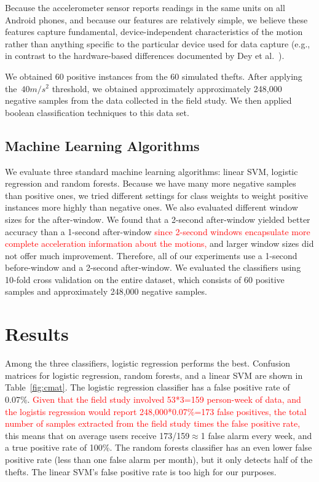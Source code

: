 Because the accelerometer sensor reports readings in the same units on all Android phones, and because our features are relatively simple, we believe these features capture fundamental, device-independent characteristics of the motion rather than anything specific to the particular device used for data capture (e.g., in contrast to the hardware-based differences documented by Dey et al.~\cite{Dey2014}).

We obtained 60 positive instances from the 60 simulated thefts.
After applying the~$40 m/s^2$ threshold, we obtained approximately approximately 248,000 negative samples from the data collected in the field study. 
We then applied boolean classification techniques to this data set.





\subsection{Machine Learning Algorithms}
We evaluate three standard machine learning algorithms: linear SVM, logistic regression and random forests.
Because we have many more negative samples than positive ones, we tried different settings for class weights to weight positive instances more highly than negative ones.
We also evaluated different window sizes for the after-window.
We found that a 2-second after-window yielded better accuracy than a 1-second after-window \textcolor{red}{since 2-second windows encapsulate more complete acceleration information about the motions,} and larger window sizes did not offer much improvement.
Therefore, all of our experiments use a 1-second before-window and a 2-second after-window.
We evaluated the classifiers using 10-fold cross validation on the entire dataset, which consists of 60 positive samples and approximately 248,000 negative samples. 



\section{Results}
Among the three classifiers, logistic regression performs the best.
Confusion matrices for logistic regression, random forests, and a linear SVM
are shown in Table~\ref{fig:cmat}.
The logistic regression classifier has a false positive rate of 0.07\%. \textcolor{red}{Given that the field study involved 53*3=159 person-week of data, and the logistis regression would report 248,000*0.07\%=173 false positives, the total number of samples extracted from the field study times the false positive rate,} this means that on average users receive 173/159$\approx$1 false alarm every week, and a true positive rate of 100\%.
The random forests classifier has an even lower false positive rate (less than one false alarm per month),
but it only detects half of the thefts.
The linear SVM's false positive rate is too high for our purposes.

